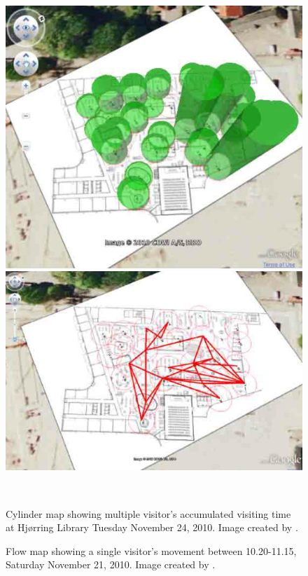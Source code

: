 \begin{figure}[htbp] \centering
\begin{minipage}[b]{0.45\textwidth} \centering
\includegraphics[width=1.00\textwidth]{Pictures/HjoerringLibrary/library_cylinder_diagram_24Nov.png} %
\end{minipage} \hfill
\begin{minipage}[b]{0.45\textwidth} \centering
\includegraphics[width=1.00\textwidth]{Pictures/HjoerringLibrary/library_flow_Nov21.png} %
\end{minipage} \\ %
\begin{minipage}[t]{0.45\textwidth}
\caption{Cylinder map showing multiple visitor's accumulated visiting time at Hj{\o}rring Library Tuesday November 24, 2010. Image created by \citep{hjoerring_study}.} %
\label{fig:library_cylindermap}
\end{minipage} \hfill
\begin{minipage}[t]{0.45\textwidth}
\caption{Flow map showing a single visitor's movement between 10.20-11.15, Saturday November 21, 2010. Image created by \citep{hjoerring_study}.} %
\label{fig:library_flowmap}
\end{minipage}
\end{figure}